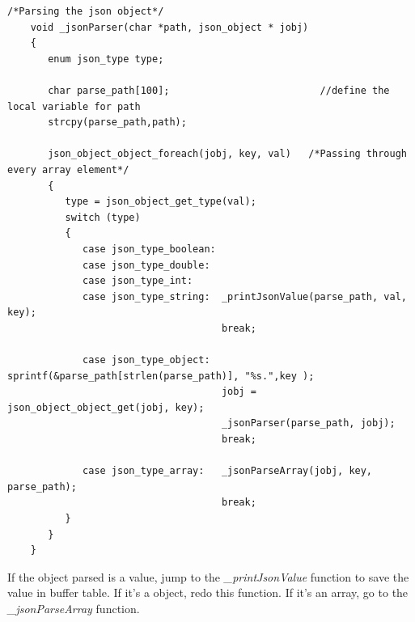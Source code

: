 \begin{lstlisting}[mathescape]
    /*Parsing the json object*/
    void _jsonParser(char *path, json_object * jobj)
    {
       enum json_type type;

       char parse_path[100];                          //define the local variable for path
       strcpy(parse_path,path);

       json_object_object_foreach(jobj, key, val)   /*Passing through every array element*/
       {
          type = json_object_get_type(val);
          switch (type)
          {
             case json_type_boolean:
             case json_type_double:
             case json_type_int:
             case json_type_string:  _printJsonValue(parse_path, val, key);
                                     break;

             case json_type_object:  sprintf(&parse_path[strlen(parse_path)], "%s.",key );
                                     jobj = json_object_object_get(jobj, key);
                                     _jsonParser(parse_path, jobj);
                                     break;

             case json_type_array:   _jsonParseArray(jobj, key, parse_path);
                                     break;
          }
       }
    }
\end{lstlisting}

If the object parsed is a value, jump to the \textit{\_printJsonValue} function to save the value in buffer table. If it's a object, redo this function. If it's an array, go to the \textit{\_jsonParseArray} function.

